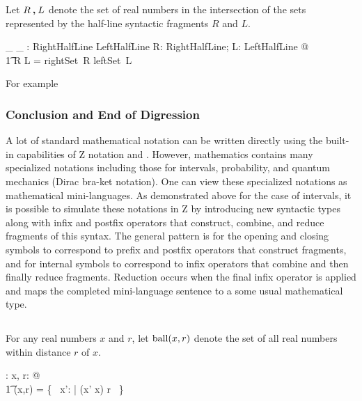 \documentclass[11pt, oneside]{article}
\begin{document}
Let $R \mathbin{\boldsymbol{,}} L$ denote the set of real numbers in the intersection of the sets represented by
the half-line syntactic fragments $R$ and $L$.

\begin{axdef}
	\_ \intersectRightLeft \_ : RightHalfLine \cross LeftHalfLine \fun \power \R
\where
	\forall R: RightHalfLine; L: LeftHalfLine @ \\
	\t1	R \intersectRightLeft L = rightSet~R \cap leftSet~L
\end{axdef}

For example

\begin{zed}
	\zeroR \in \closedLowerBound \zeroR \intersectRightLeft \oneR \openUpperBound
\end{zed}

\subsubsection{Conclusion and End of Digression}

A lot of standard mathematical notation can be written directly using the built-in capabilities of Z notation and \fuzz.
However, mathematics contains many specialized notations including those for intervals, probability, and quantum mechanics (Dirac bra-ket notation).
One can view these specialized notations as mathematical mini-languages.
As demonstrated above for the case of intervals, it is possible to simulate these notations in Z by introducing new syntactic types along with infix and postfix operators that construct, combine, and reduce fragments of this syntax.
The general pattern is for the opening and closing symbols to correspond to prefix and postfix operators that
construct fragments, and for internal symbols to correspond to infix operators that combine and then finally 
reduce fragments.
Reduction occurs when the final infix operator is applied and maps the completed mini-language sentence to a 
some usual mathematical type.

\subsection{}

For any real numbers $x$ and $r$, let $\operatorname{ball}(x,r)$ denote the set of all real numbers within distance $r$ of $x$.

\begin{axdef}
	\ballRR: \R \cross \R \fun \power \R
\where
	\forall x, r: \R @ \\
	\t1	\ballRR(x,r) = \{~ x': \R | \absR(x' \subR x) \ltR r ~\}
\end{axdef}
\end{document}
